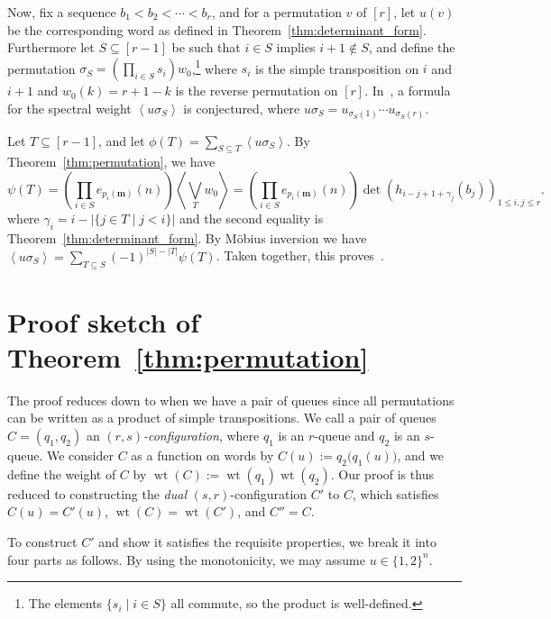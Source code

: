 \documentclass[submission]{FPSAC2018}
\newcommand{\swt}[1]{\left\langle #1 \right\rangle} %
\DeclareMathOperator{\wt}{wt} %
\newcommand{\mm}{\mathbf{m}}
\newcommand{\ive}[1]{\left[ #1 \right]}
\newcommand{\defn}[1]{{\color{darkred}\emph{#1}}} %
\theoremstyle{plain}
\theoremstyle{definition}
\numberwithin{equation}{section}
\begin{document}
Now, fix a sequence $b_1 < b_2 < \cdots < b_r$, and for a permutation $v$ of $\ive{r}$, let $u(v)$ be the corresponding word as defined in Theorem~\ref{thm:determinant_form}.
Furthermore let $S \subseteq \ive{r-1}$ be such that $i\in S$ implies $i+1 \notin S$, and define the permutation $\sigma_S = \left( \prod_{i \in S} s_i \right) w_0$,\footnote{The elements $\{s_i \mid i \in S\}$ all commute, so the product is well-defined.} where $s_i$ is the simple transposition on $i$ and $i+1$ and $w_0(k) = r+1-k$ is the reverse permutation on $\ive{r}$.
In~\cite{AasLin17}, a formula for the spectral weight $\swt{u \sigma_S}$ is conjectured, where $u \sigma_S = u_{\sigma_S(1)} \cdots u_{\sigma_S(r)}$.

Let $T \subseteq \ive{r-1}$, and let $\phi(T) = \sum_{S \subseteq T} \swt{u \sigma_S}$.
By Theorem~\ref{thm:permutation}, we have
\[
  \psi(T) = \left(\prod_{i\in S} e_{p_i(\mm)}(n) \right) \swt{ \bigvee_T w_0} = \left(\prod_{i\in S} e_{p_i(\mm)}(n) \right) \det(h_{i-j+1+\gamma_j}(b_j))_{1\leq i,j \leq r}.
\]
where $\gamma_i = i - \lvert \{j\in T \mid j < i \} \rvert$ and the second equality is Theorem~\ref{thm:determinant_form}.
By M\"obius inversion we have $\swt{u \sigma_S} = \sum_{T\subseteq S} (-1)^{|S|-|T|} \psi(T)$.
Taken together, this proves~\cite[Conj.~3.10]{AasLin17}.







\section{Proof sketch of Theorem~\ref{thm:permutation}}
\label{sec:proof_sketch}

The proof reduces down to when we have a pair of queues since all permutations can be written as a product of simple transpositions.
We call a pair of queues $C = (q_1, q_2)$ an \defn{$(r,s)$-configuration}, where $q_1$ is an $r$-queue and $q_2$ is an $s$-queue.
We consider $C$ as a function on words by $C(u) := q_2\bigr(q_1(u)\bigr)$, and we define the weight of $C$ by $\wt(C) := \wt(q_1) \wt(q_2)$.
Our proof is thus reduced to constructing the \defn{dual} $(s,r)$-configuration $C'$ to $C$, which satisfies $C(u) = C'(u)$, $\wt(C) = \wt(C')$, and $C'' = C$.

To construct $C'$ and show it satisfies the requisite properties, we break it into four parts as follows.
By using the monotonicity, we may assume $u \in \{1,2\}^n$.
\end{document}
